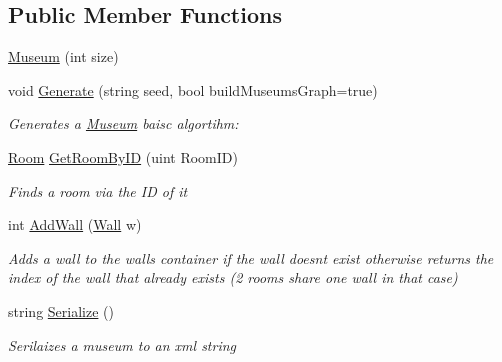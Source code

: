 \subsection*{Public Member Functions}
\begin{DoxyCompactItemize}
\item 
\mbox{\hyperlink{class_museum_aa946df02a55ba522f7a39ac688648733}{Museum}} (int size)
\item 
void \mbox{\hyperlink{class_museum_a2a301b4e27f35da164ffa03b3d3d7e81}{Generate}} (string seed, bool build\+Museums\+Graph=true)
\begin{DoxyCompactList}\small\item\em Generates a \mbox{\hyperlink{class_museum}{Museum}} baisc algortihm\+: \end{DoxyCompactList}\item 
\mbox{\hyperlink{class_room}{Room}} \mbox{\hyperlink{class_museum_a31c3e63a3a1e2edf6e219cb1f04b9515}{Get\+Room\+By\+ID}} (uint Room\+ID)
\begin{DoxyCompactList}\small\item\em Finds a room via the ID of it \end{DoxyCompactList}\item 
int \mbox{\hyperlink{class_museum_a6e441db98efeaa314ae974222aea08e6}{Add\+Wall}} (\mbox{\hyperlink{class_wall}{Wall}} w)
\begin{DoxyCompactList}\small\item\em Adds a wall to the walls container if the wall doesn\textquotesingle{}t exist otherwise returns the index of the wall that already exists (2 rooms share one wall in that case) \end{DoxyCompactList}\item 
string \mbox{\hyperlink{class_museum_ac956bb7d7454f99944af157c79f695b8}{Serialize}} ()
\begin{DoxyCompactList}\small\item\em Serilaizes a museum to an xml string \end{DoxyCompactList}\end{DoxyCompactItemize}
